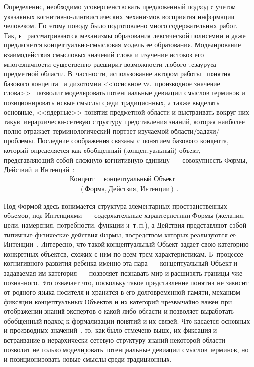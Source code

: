 \begin{multicols}{2}
     Определенно, необходимо усовершенствовать предложенный подход с 
учетом указанных ког\-ни\-тив\-но-линг\-ви\-сти\-че\-ских механизмов 
восприятия информации человеком. По этому поводу было подготовлено 
много содержательных работ. Так, в~\cite{26-ko} рассматриваются 
механизмы образования лексической полисемии и даже предлагается 
     кон\-цеп\-ту\-аль\-но-смыс\-ло\-вая модель ее образования. 
Моделирование взаимодействия смысловых значений слова и изучение 
истоков его многозначности существенно расширит возможности любого 
тезауруса предметной области. В~частности, использование автором 
работы~\cite{26-ko} понятия базового концепта~\cite{27-ko} и дихотомии 
<<основное vs.\ производное значение слова>>~\cite{28-ko} позволит 
моделировать потенциальные девиации смыслов терминов и 
позиционировать новые смыслы среди традиционных, а также выделять 
основные, <<ядерные>> понятия предметной области и выстраивать вокруг 
них такую ие\-рар\-хи\-чески-се\-те\-вую структуру представления знаний, 
которая наиболее полно отражает терминологический портрет изучаемой 
     об\-ласти/за\-да\-чи/проб\-ле\-мы. Последние соображения связаны с 
понятием базового концепта, который определяется как обобщенный 
(концептуальный) объект, пред\-став\-ля\-ющий собой сложную когнитивную 
единицу~--- совокупность Формы, Действий и Интенций~\cite{26-ko}:
     \begin{multline*}
\mbox{Концепт} = \mbox{концептуальный Объект} ={}\\
{}= (\mbox{Форма, Действия, 
Интенции})\,.
\end{multline*}

     Под Формой здесь понимается структура элементарных 
пространственных объемов, под Интенциями~--- содержательные 
характеристики Формы (желания, цели, намерения, потребности, функции 
и~т.\,п.), а Действия представляют собой типичные физические действия 
Формы, посредством которых реализуются ее Интенции~\cite{26-ko}. 
Интересно, что такой концептуальный Объект задает свою категорию 
конкретных объектов, схожих с ним по всем трем характеристикам. 
В~процессе когнитивного развития ребенка именно эта пара~--- 
концептуальный Объект и задаваемая им категория~--- позволяет познавать 
мир и расширять границы уже познанного. Это означает что, поскольку такое 
представление понятий не зависит от родного языка носителя и хранится в 
его долговременной памяти, механизм фиксации концептуальных Объектов и 
их категорий чрезвычайно важен при отображении знаний экспертов о 
     ка\-кой-ли\-бо об\-ласти и позволяет выработать обобщенный подход к 
формализации понятий и их связей.
     Что касается основных и производных значений~\cite{28-ko}, то, как 
было отмечено выше, их фиксация и встраивание в 
     иерар\-хи\-чески-се\-те\-вую структуру знаний некоторой области 
позволит не только моделировать потенциальные девиации смыслов 
терминов, но и позиционировать новые смыслы среди традиционных. 


\end{multicols}
